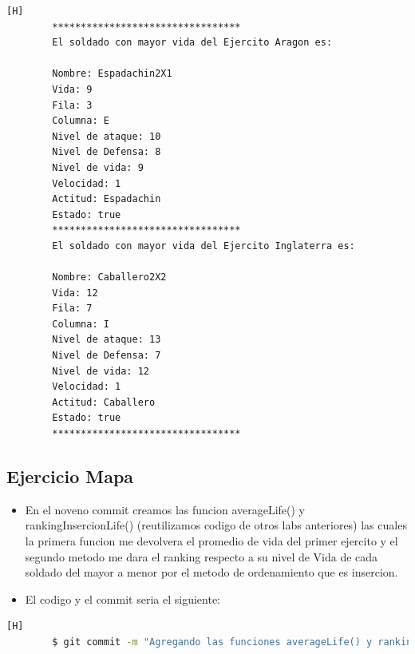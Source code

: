 \documentclass{article}
\begin{document}
	\begin{lstlisting}[language=bash,caption={Ejecucion:}][H]
		*********************************
		El soldado con mayor vida del Ejercito Aragon es: 
		
		Nombre: Espadachin2X1
		Vida: 9
		Fila: 3
		Columna: E
		Nivel de ataque: 10
		Nivel de Defensa: 8
		Nivel de vida: 9
		Velocidad: 1
		Actitud: Espadachin
		Estado: true
		*********************************
		El soldado con mayor vida del Ejercito Inglaterra es: 
		
		Nombre: Caballero2X2
		Vida: 12
		Fila: 7
		Columna: I
		Nivel de ataque: 13
		Nivel de Defensa: 7
		Nivel de vida: 12
		Velocidad: 1
		Actitud: Caballero
		Estado: true
		*********************************
	\end{lstlisting}
	\subsection{Ejercicio Mapa}
	\begin{itemize}	
		\item En el noveno commit creamos las funcion averageLife() y rankingInsercionLife() (reutilizamos codigo de otros labs anteriores) las cuales la primera funcion me devolvera el promedio de vida del primer ejercito y el segundo metodo me dara el ranking respecto a su nivel de Vida de cada soldado del mayor a menor por el metodo de ordenamiento que es insercion.
		\item El codigo y el commit seria el siguiente:
	\end{itemize}	
	\begin{lstlisting}[language=bash,caption={Commit}][H]
		$ git commit -m "Agregando las funciones averageLife() y rankingInsercionLife() las cuales la primera funcion me devolvera el promedio de vida del primer ejercito y el segundo metodo me dara el ranking respecto a su nivel de Vida de cada soldado del mayor a menor por el metodo de ordenamiento que es insercion"
	\end{lstlisting}	
\end{document}
